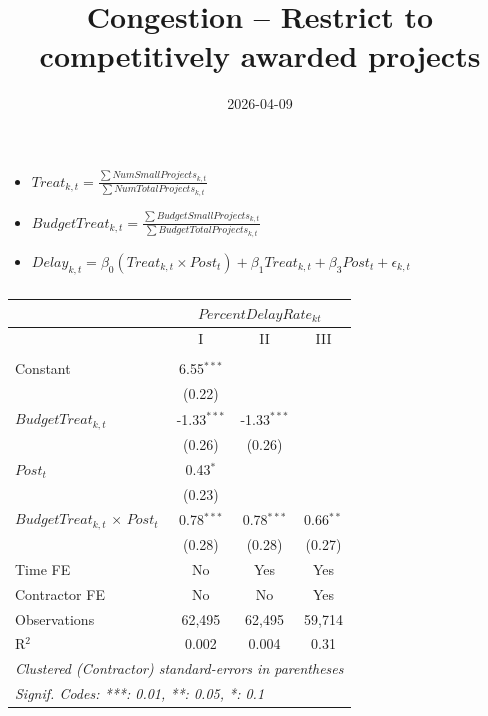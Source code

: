 \documentclass[
]{article}
\title{Congestion -- Restrict to competitively awarded projects}
\author{}
\date{\vspace{-2.5em}2026-04-09}
\providecommand{\tightlist}{%
  \setlength{\itemsep}{0pt}\setlength{\parskip}{0pt}}
\begin{document}
\maketitle

\begin{itemize}
\tightlist
\item
  \(Treat_{k,t} = \frac{\sum Num Small Projects_{k,t}}{\sum Num Total Projects_{k,t}}\)
\item
  \(BudgetTreat_{k,t} = \frac{\sum Budget Small Projects_{k,t}}{\sum Budget Total Projects_{k,t}}\)
\item
  \(Delay_{k,t} = \beta_0 (Treat_{k,t} \times Post_t) + \beta_1 Treat_{k,t} + \beta_3 Post_t + \epsilon_{k,t}\)
\end{itemize}

\begin{table}[htbp]
   \caption{}
   \centering
   \begin{tabular}{lccc}
      \toprule
      \midrule  & \multicolumn{3}{c}{$PercentDelayRate_{kt}$}\\
      \midrule  & I & II & III\\
      \midrule \\
      Constant                               & 6.55$^{***}$  &               &   \\   
                                             & (0.22)        &               &   \\   
      $BudgetTreat_{k,t}$                    & -1.33$^{***}$ & -1.33$^{***}$ &   \\   
                                             & (0.26)        & (0.26)        &   \\   
      $Post_t$                               & 0.43$^{*}$    &               &   \\   
                                             & (0.23)        &               &   \\   
      $BudgetTreat_{k,t}$ $\times$ $Post_t$  & 0.78$^{***}$  & 0.78$^{***}$  & 0.66$^{**}$\\   
                                             & (0.28)        & (0.28)        & (0.27)\\   
      \midrule 
      Time FE                                & No            & Yes           & Yes\\  
      Contractor FE                          & No            & No            & Yes\\  
      Observations                           & 62,495        & 62,495        & 59,714\\  
      R$^2$                                  & 0.002         & 0.004         & 0.31\\  
      \midrule
      \multicolumn{4}{l}{\emph{Clustered (Contractor) standard-errors in parentheses}}\\
      \multicolumn{4}{l}{\emph{Signif. Codes: ***: 0.01, **: 0.05, *: 0.1}}\\
   \end{tabular}
\end{table}
\end{document}

